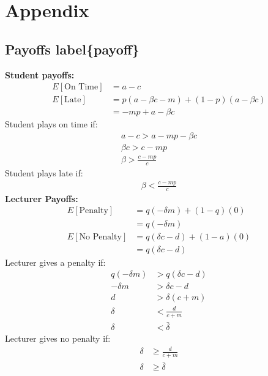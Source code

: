 \documentclass[11pt,preprint, authoryear]{elsarticle}
\numberwithin{equation}{section}
\numberwithin{figure}{section}
\numberwithin{table}{section}
\begin{document}
\newpage

\hypertarget{appendix}{%
\section*{\texorpdfstring{Appendix
\label{app1}}{Appendix }}\label{appendix}}

\hypertarget{payoffs-labelpayoff}{%
\subsection*{Payoffs label\{payoff\}}\label{payoffs-labelpayoff}}

\textbf{Student payoffs:} \begin{align*}
E[\text{On Time}]&= a- c \\
E[\text{Late}]&=  p(a-\beta c-m) +(1-p)(a-\beta c) \\
&=-m p+a-\beta c
\end{align*} Student plays on time if: \begin{align*}
a-c>a-m p-\beta c \\
\beta c>c-m p \\
\beta>\frac{c-m p}{c}
\end{align*} Student plays late if: \begin{align*}
\beta<\frac{c-m p}{c}
\end{align*} \textbf{Lecturer Payoffs:} \begin{align*}
E[\text{Penalty}]&=q(-\delta m)+(1-q)(0) \\
&=q(-\delta m) \\
E[\text{No Penalty}] &=q(\delta c-d)+(1-a)(0) \\
&=q(\delta c-d)
\end{align*} Lecturer gives a penalty if: \begin{align*}
q(-\delta m)&>q(\delta c-d) \\
-\delta m&>\delta c-d \\
d&>\delta(c+m) \\
\delta&<\frac{d}{c+m} \\
\delta &<\bar{\delta}
\end{align*} Lecturer gives no penalty if: \begin{align*}
\delta &\geq \frac{d}{c+m} \\
\delta &\geq \bar{\delta} \\
\end{align*}
\end{document}
